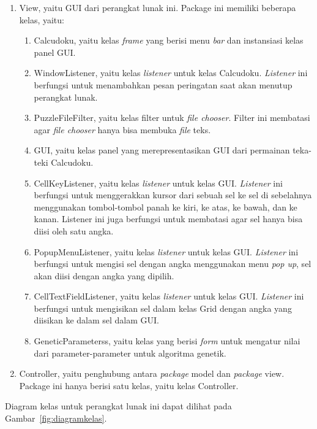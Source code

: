 \begin{enumerate}
\item View, yaitu GUI dari perangkat lunak ini. Package ini memiliki beberapa kelas, yaitu:
	\begin{enumerate}
	\item Calcudoku, yaitu kelas \textit{frame} yang berisi menu \textit{bar} dan instansiasi kelas panel GUI.
	\item WindowListener, yaitu kelas \textit{listener} untuk kelas Calcudoku. \textit{Listener} ini berfungsi untuk menambahkan pesan peringatan saat akan menutup perangkat lunak.
	\item PuzzleFileFilter, yaitu kelas filter untuk \textit{file chooser}. Filter ini membatasi agar \textit{file chooser} hanya bisa membuka \textit{file} teks.
	\item GUI, yaitu kelas panel yang merepresentasikan GUI dari permainan teka-teki Calcudoku.
	\item CellKeyListener, yaitu kelas \textit{listener} untuk kelas GUI. \textit{Listener} ini berfungsi untuk menggerakkan kursor dari sebuah sel ke sel di sebelahnya menggunakan tombol-tombol panah ke kiri, ke atas, ke bawah, dan ke kanan. Listener ini juga berfungsi untuk membatasi agar sel hanya bisa diisi oleh satu angka.
	\item PopupMenuListener, yaitu kelas \textit{listener} untuk kelas GUI. \textit{Listener} ini berfungsi untuk mengisi sel dengan angka menggunakan menu \textit{pop up}, sel akan diisi dengan angka yang dipilih.
	\item CellTextFieldListener, yaitu kelas \textit{listener} untuk kelas GUI. \textit{Listener} ini berfungsi untuk mengisikan sel dalam kelas Grid dengan angka yang diisikan ke dalam sel dalam GUI.
	\item GeneticParameterss, yaitu kelas yang berisi \textit{form} untuk mengatur nilai dari parameter-parameter untuk algoritma genetik.
	\end{enumerate}
\item Controller, yaitu penghubung antara \textit{package} model dan \textit{package} view. Package ini hanya berisi satu kelas, yaitu kelas Controller.
\end{enumerate}

Diagram kelas untuk perangkat lunak ini dapat dilihat pada Gambar~\ref{fig:diagramkelas}.

